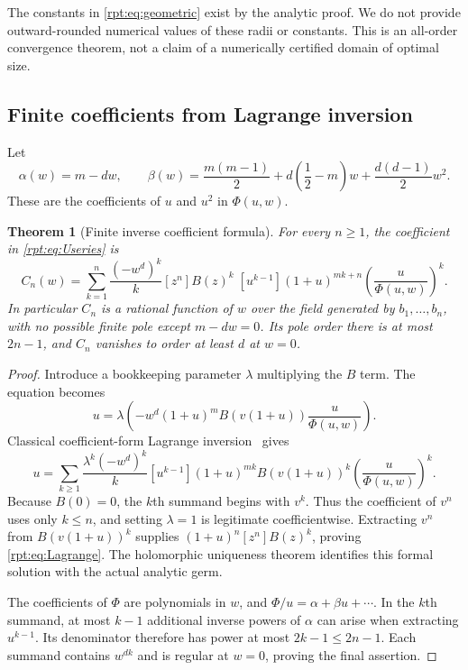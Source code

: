 \documentclass[11pt,a4paper]{article}
\numberwithin{equation}{section}
\newtheorem{theorem}{Theorem}[section]
\theoremstyle{definition}\newtheorem{definition}[theorem]{Definition}
\theoremstyle{remark}\newtheorem{remark}[theorem]{Remark}
\newcommand{\coef}[2]{[#1^{#2}]}
\begin{document}
The constants in \eqref{rpt:eq:geometric} exist by the analytic proof. We do not provide outward-rounded numerical values of these radii or constants. This is an all-order convergence theorem, not a claim of a numerically certified domain of optimal size.

\subsection{Finite coefficients from Lagrange inversion}

Let
\begin{equation}
\alpha(w)=m-dw,\qquad
\beta(w)=\frac{m(m-1)}2+d\left(\frac12-m\right)w
 +\frac{d(d-1)}2w^2.
\label{rpt:eq:alphabeta}
\end{equation}
These are the coefficients of $u$ and $u^2$ in $\Phi(u,w)$.

\begin{theorem}[Finite inverse coefficient formula]
\label{rpt:thm:coeff}
For every $n\ge1$, the coefficient in \eqref{rpt:eq:Useries} is
\begin{equation}
\boxed{\quad
C_n(w)=\sum_{k=1}^{n}\frac{(-w^d)^k}{k}
\coef{z}{n}B(z)^k\;
\coef{u}{k-1}(1+u)^{mk+n}
\left(\frac{u}{\Phi(u,w)}\right)^k.\quad}
\label{rpt:eq:Lagrange}
\end{equation}
In particular $C_n$ is a rational function of $w$ over the field generated by $b_1,\ldots,b_n$, with no possible finite pole except $m-dw=0$. Its pole order there is at most $2n-1$, and $C_n$ vanishes to order at least $d$ at $w=0$.
\end{theorem}
\begin{proof}
Introduce a bookkeeping parameter $\lambda$ multiplying the $B$ term. The equation becomes
\[
u=\lambda\left(-w^d(1+u)^mB(v(1+u))\frac{u}{\Phi(u,w)}\right).
\]
Classical coefficient-form Lagrange inversion~\cite{dlmfcomplex} gives
\[
u=\sum_{k\ge1}\frac{\lambda^k(-w^d)^k}{k}
\coef{u}{k-1}(1+u)^{mk}B(v(1+u))^k
\left(\frac{u}{\Phi(u,w)}\right)^k.
\]
Because $B(0)=0$, the $k$th summand begins with $v^k$. Thus the coefficient of $v^n$ uses only $k\le n$, and setting $\lambda=1$ is legitimate coefficientwise. Extracting $v^n$ from $B(v(1+u))^k$ supplies $(1+u)^n\coef{z}{n}B(z)^k$, proving \eqref{rpt:eq:Lagrange}. The holomorphic uniqueness theorem identifies this formal solution with the actual analytic germ.

The coefficients of $\Phi$ are polynomials in $w$, and $\Phi/u=\alpha+\beta u+\cdots$. In the $k$th summand, at most $k-1$ additional inverse powers of $\alpha$ can arise when extracting $u^{k-1}$. Its denominator therefore has power at most $2k-1\le2n-1$. Each summand contains $w^{dk}$ and is regular at $w=0$, proving the final assertion.
\end{proof}
\end{document}
